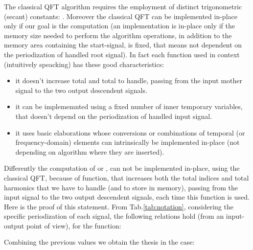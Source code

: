 \documentclass[a4paper,10pt]{article}
\begin{document}
The classical QFT algorithm requires the employment of  distinct trigonometric (secant) constants: .
Moreover the classical QFT can be implemented in-place only if our goal is the  computation (an implementation is in-place only if the memory size needed to perform the algorithm operations, in addition to the memory area containing the start-signal, is fixed, that means not dependent on the periodization  of handled root signal).
In fact each function used in  context (intuitively speacking) has these good characteristics:
\begin{itemize}

\item 
it doesn't increase total  and total  to handle, passing from the input mother signal to the two output descendent signals.

\item 
it can be implememnted using a fixed number of inner temporary variables, that doesn't depend on the periodization  of handled input signal.

\item
it uses basic elaborations whose conversions or combinations of temporal (or frequency-domain) elements can intrinsically be implemented in-place (not depending on algorithm where they are inserted).

\end{itemize}
Differently the computation of  or , can not be implemented in-place, using the classical QFT, because of  function, that increases both the total  indices and total  harmonics that we have to handle (and to store in memory), passing from the input signal to the two output descendent signals, each time this function is used.
Here is the proof of this statement.
From  Tab.\ref{tab:notation}, considering the specific periodization of each signal, the following relations hold 
(from an input-output point of view), for the  function:

Combining the previous values we obtain the thesis in the  case:
\end{document}

